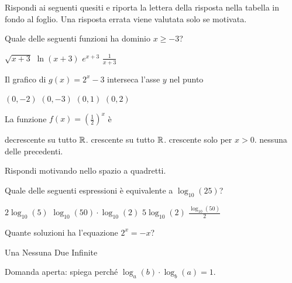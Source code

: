 \documentclass[10pt]{article}
\begin{document}
\testheader[date=23/10/2026, title={Funzioni e grafici}]

\exercise Rispondi ai seguenti quesiti e riporta la lettera della risposta
nella tabella in fondo al foglio. Una risposta errata viene valutata solo se
motivata.

\begin{parts}[shuffle]
  \itemx[pts=1] Quale delle seguenti funzioni ha dominio $x \geq -3$?
    \begin{choices}
      \correct $\sqrt{x+3}$ \choice $\ln(x+3)$ \choice $e^{x+3}$ \choice $\frac{1}{x+3}$
    \end{choices}
  \itemx[pts=1] Il grafico di $g(x) = 2^x - 3$ interseca l'asse $y$ nel punto
    \begin{choices}
      \correct $(0, -2)$ \choice $(0, -3)$ \choice $(0, 1)$ \choice $(0, 2)$
    \end{choices}
  \itemx[pts=1, noreduced] La funzione $f(x) = \left(\frac{1}{2}\right)^x$ è
    \begin{choices}
      \correct decrescente su tutto $\spR$.
      \choice  crescente su tutto $\spR$.
      \choice  crescente solo per $x > 0$.
      \choice[fixed] nessuna delle precedenti.
    \end{choices}
\end{parts}
\exercisescore

\exercise[motivation=2] Rispondi motivando nello spazio a quadretti.

\begin{parts}
  \itemx[pts=1] Quale delle seguenti espressioni è equivalente a $\log_{10}(25)$?
    \begin{choices}
      \correct $2 \log_{10}(5)$ \choice $\log_{10}(50) \cdot \log_{10}(2)$
      \choice $5 \log_{10}(2)$ \choice $\frac{\log_{10}(50)}{2}$
    \end{choices}
  \itemx[pts=1] Quante soluzioni ha l'equazione $2^x = -x$?
    \begin{choices}
      \correct Una \choice Nessuna \choice Due \choice Infinite
    \end{choices}
  \itemx[pts=2] Domanda aperta: spiega perché $\log_a(b) \cdot \log_b(a) = 1$.
\end{parts}
\exercisescore

\vfill
\answergrid
\finalscore
\end{document}
